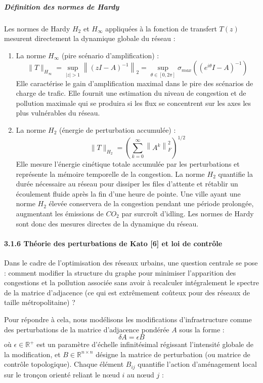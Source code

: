 \documentclass[10pt, a4paper]{article}
\begin{document}
\subparagraph{Définition des normes de
Hardy}\label{duxe9finition-des-normes-de-hardy}

Les normes de Hardy \(H_2\) et \(H_\infty\) appliquées à la fonction de
transfert \(T(z)\) mesurent directement la dynamique globale du réseau :

\begin{enumerate}
\def\labelenumi{\arabic{enumi}.}
\item
  La norme \(H_\infty\) (pire scénario d'amplification) :
  \[\|T\|_{H_\infty} = \sup_{|z| > 1} \left\| (zI - A)^{-1} \right\|_2 = \sup_{\theta \in [0, 2\pi]} \sigma_{max}\left( (e^{i\theta}I - A)^{-1} \right)\]
  Elle caractérise le gain d'amplification maximal dans le pire des
  scénarios de charge de trafic. Elle fournit une estimation du niveau
  de congestion et de pollution maximale qui se produira si les flux se
  concentrent sur les axes les plus vulnérables du réseau.
\item
  La norme \(H_2\) (énergie de perturbation accumulée) :
  \[\|T\|_{H_2} = \left( \sum_{k=0}^{\infty} \left\| A^k \right\|_F^2 \right)^{1/2}\]
  Elle mesure l'énergie cinétique totale accumulée par les perturbations
  et représente la mémoire temporelle de la congestion. La norme \(H_2\)
  quantifie la durée nécessaire au réseau pour dissiper les files
  d'attente et rétablir un écoulement fluide après la fin d'une heure de
  pointe. Une ville ayant une norme \(H_2\) élevée conservera de la
  congestion pendant une période prolongée, augmentant les émissions de
  \(CO_2\) par surcroît d'idling. Les normes de Hardy sont donc des
  mesures directes de la dynamique du réseau.
\end{enumerate}

\paragraph{3.1.6 Théorie des perturbations de Kato {[}6{]} et loi de
contrôle}\label{thuxe9orie-des-perturbations-de-kato-6-et-loi-de-contruxf4le}

Dans le cadre de l'optimisation des réseaux urbains, une question
centrale se pose : comment modifier la structure du graphe pour
minimiser l'apparition des congestions et la pollution associée sans
avoir à recalculer intégralement le spectre de la matrice d'adjacence
(ce qui est extrêmement coûteux pour des réseaux de taille
métropolitaine) ?

Pour répondre à cela, nous modélisons les modifications d'infrastructure
comme des perturbations de la matrice d'adjacence pondérée \(A\) sous la
forme : \[\delta A = \epsilon B\] où \(\epsilon \in \mathbb{R}^+\) est
un paramètre d'échelle infinitésimal régissant l'intensité globale de la
modification, et \(B \in \mathbb{R}^{n \times n}\) désigne la matrice de
perturbation (ou matrice de contrôle topologique). Chaque élément
\(B_{ij}\) quantifie l'action d'aménagement local sur le tronçon orienté
reliant le nœud \(i\) au nœud \(j\) :
\end{document}
